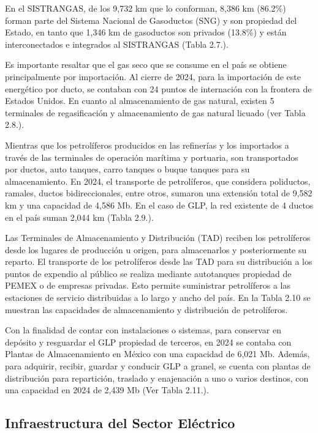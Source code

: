 \documentclass{sener2025}
\begin{document}
En el SISTRANGAS, de los 9,732 km que lo conforman, 8,386 km (86.2\%) forman parte del Sistema Nacional de Gasoductos (SNG) y son propiedad del Estado, en tanto que 1,346 km de gasoductos son privados (13.8\%) y están interconectados e integrados al SISTRANGAS (Tabla 2.7.).

Es importante resaltar que el gas seco que se consume en el país se obtiene principalmente por importación. Al cierre de 2024, para la importación de este energético por ducto, se contaban con 24 puntos de internación con la frontera de Estados Unidos. En cuanto al almacenamiento de gas natural, existen 5 terminales de regasificación y almacenamiento de gas natural licuado (ver Tabla 2.8.).

Mientras que los petrolíferos producidos en las refinerías y los importados a través de las terminales de operación marítima y portuaria, son transportados por ductos, auto tanques, carro tanques o buque tanques para su almacenamiento. En 2024, el transporte de petrolíferos, que considera poliductos, ramales, ductos bidireccionales, entre otros, sumaron una extensión total de 9,582 km y una capacidad de 4,586 Mb. En el caso de GLP, la red existente de 4 ductos en el país suman 2,044 km (Tabla 2.9.).

Las Terminales de Almacenamiento y Distribución (TAD) reciben los petrolíferos desde los lugares de producción u origen, para almacenarlos y posteriormente su reparto. El transporte de los petrolíferos desde las TAD para su distribución a los puntos de expendio al público se realiza mediante autotanques propiedad de PEMEX o de empresas privadas. Esto permite suministrar petrolíferos a las estaciones de servicio distribuidas a lo largo y ancho del país. En la Tabla 2.10 se muestran las capacidades de almacenamiento y distribución de petrolíferos.

Con la finalidad de contar con instalaciones o sistemas, para conservar en depósito y resguardar el GLP propiedad de terceros, en 2024 se contaba con Plantas de Almacenamiento en México con una capacidad de 6,021 Mb. Además, para adquirir, recibir, guardar y conducir GLP a granel, se cuenta con plantas de distribución para repartición, traslado y enajenación a uno o varios destinos, con una capacidad en 2024 de 2,439 Mb (Ver Tabla 2.11.).


\subsection{Infraestructura del Sector Eléctrico}
\end{document}
